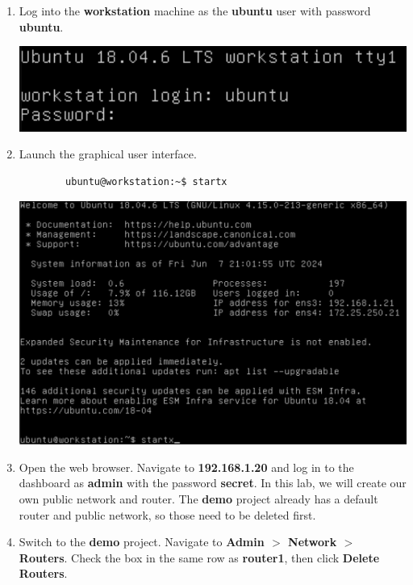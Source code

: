 \documentclass[letterpaper, 12pt]{article}
\begin{document}
\begin{enumerate}
    \item Log into the \textbf{workstation} machine as the \textbf{ubuntu} user with password \textbf{ubuntu}.

    \begin{center}
        \includegraphics[width=\linewidth]{images/part1/step1.png}
    \end{center}

    \item Launch the graphical user interface.
    \begin{lstlisting}
        ubuntu@workstation:~$ startx
    \end{lstlisting}

    \begin{center}
        \includegraphics[width=\linewidth]{images/part1/step2.png}
    \end{center}

    \item Open the web browser. Navigate to \textbf{192.168.1.20} and log in to the dashboard as \textbf{admin}
    with the password \textbf{secret}. In this lab, we will create our own public network and router. The \textbf{demo}
    project already has a default router and public network, so those need to be deleted first.

    \item Switch to the \textbf{demo} project. Navigate to \textbf{Admin $>$ Network $>$ Routers}. Check the box in the
    same row as \textbf{router1}, then click \textbf{Delete Routers}.


\end{enumerate}
\end{document}
